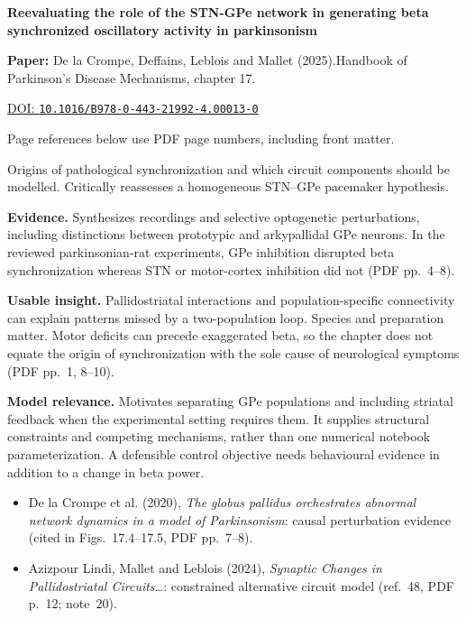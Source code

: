 

{\Large\bfseries Reevaluating the role of the STN-GPe network in generating beta synchronized oscillatory activity in parkinsonism\par}

\textbf{Paper:} De la Crompe, Deffains, Leblois and Mallet (2025).\quad Handbook of Parkinson's Disease Mechanisms, chapter 17.\par
\href{https://doi.org/10.1016/B978-0-443-21992-4.00013-0}{DOI: \nolinkurl{10.1016/B978-0-443-21992-4.00013-0}}\par
{\footnotesize Page references below use PDF page numbers, including front matter.}

Origins of pathological synchronization and which circuit components should be modelled. Critically reassesses a homogeneous STN--GPe pacemaker hypothesis.

\textbf{Evidence.} Synthesizes recordings and selective optogenetic perturbations, including distinctions between prototypic and arkypallidal GPe neurons. In the reviewed parkinsonian-rat experiments, GPe inhibition disrupted beta synchronization whereas STN or motor-cortex inhibition did not (PDF pp.~4--8).

\textbf{Usable insight.} Pallidostriatal interactions and population-specific connectivity can explain patterns missed by a two-population loop. Species and preparation matter. Motor deficits can precede exaggerated beta, so the chapter does not equate the origin of synchronization with the sole cause of neurological symptoms (PDF pp.~1, 8--10).

\textbf{Model relevance.} Motivates separating GPe populations and including striatal feedback when the experimental setting requires them. It supplies structural constraints and competing mechanisms, rather than one numerical notebook parameterization. A defensible control objective needs behavioural evidence in addition to a change in beta power.

\begin{itemize}
\item De la Crompe et al. (2020), \emph{The globus pallidus orchestrates abnormal network dynamics in a model of Parkinsonism}: causal perturbation evidence (cited in Figs.~17.4--17.5, PDF pp.~7--8).
\item Azizpour Lindi, Mallet and Leblois (2024), \emph{Synaptic Changes in Pallidostriatal Circuits\ldots}: constrained alternative circuit model (ref.~48, PDF p.~12; note~20).
\end{itemize}


